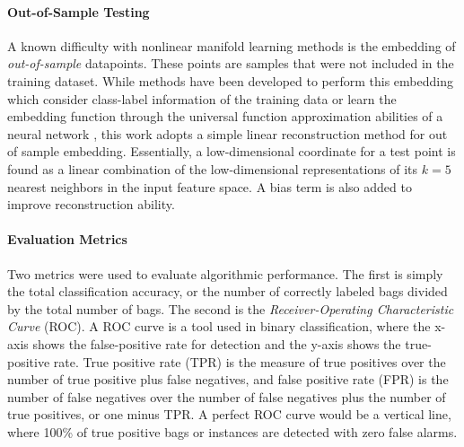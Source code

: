 \paragraph{Out-of-Sample Testing}
A known difficulty with nonlinear manifold learning methods is the embedding of \textit{out-of-sample} datapoints.  These points are samples that were not included in the training  dataset.  While methods have been developed to perform this embedding which consider class-label information of the training data or learn the embedding function through the universal function approximation abilities of a neural network \citep{Vural2016OutOfSampleSupManifoldLearning,Mendoza2016ELMOutOfSample}, this work adopts a simple linear reconstruction method for out of sample embedding.  Essentially, a low-dimensional coordinate for a test point is found as a linear combination of the low-dimensional representations of its $k=5$ nearest neighbors in the input feature space.  A bias term is also added to improve reconstruction ability.  


\paragraph{Evaluation Metrics}
Two metrics were used to evaluate algorithmic performance.  The first is simply the total classification accuracy, or the number of correctly labeled bags divided by the total number of bags.  The second is the \textit{Receiver-Operating Characteristic Curve} (ROC).  A ROC curve is a tool used in binary classification, where the x-axis shows the false-positive rate for detection and the y-axis shows the true-positive rate.  True positive rate (TPR) is the measure of true positives over the number of true positive plus false negatives, and false positive rate (FPR) is the number  of false negatives over the number of false negatives plus the number of true positives, or one minus TPR.  A perfect ROC curve would be a vertical line, where 100\% of true positive bags or instances are detected with zero false alarms.



